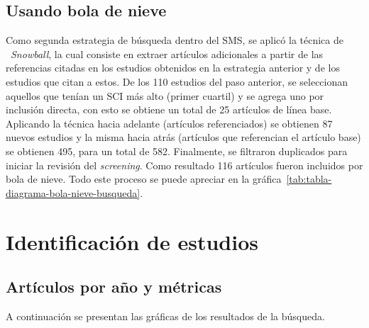 \subsection{Usando bola de nieve}
\noindent
Como segunda estrategia de búsqueda dentro del SMS, se aplicó la técnica de ~\textit{Snowball}, la cual consiste en extraer artículos adicionales a partir de las referencias citadas en los estudios obtenidos en la estrategia anterior y de los estudios que citan a estos. De los 110 estudios del paso anterior, se seleccionan aquellos que tenían un SCI más alto (primer cuartil) y se agrega uno por inclusión directa, con esto se obtiene un total de 25 artículos de línea base. Aplicando la técnica hacia adelante (artículos referenciados) se obtienen 87 nuevos estudios y la misma hacia atrás (artículos que referencian el artículo base) se obtienen 495, para un total de 582. Finalmente, se filtraron duplicados para iniciar la revisión del \textit{screening}. Como resultado 116 artículos fueron incluidos por bola de nieve. Todo este proceso se puede apreciar en la gráfica~\ref{tab:tabla-diagrama-bola-nieve-busqueda}.


\section{Identificación de estudios}

\subsection{Artículos por año y métricas}
\noindent
A continuación se presentan las gráficas de los resultados de la búsqueda. 


